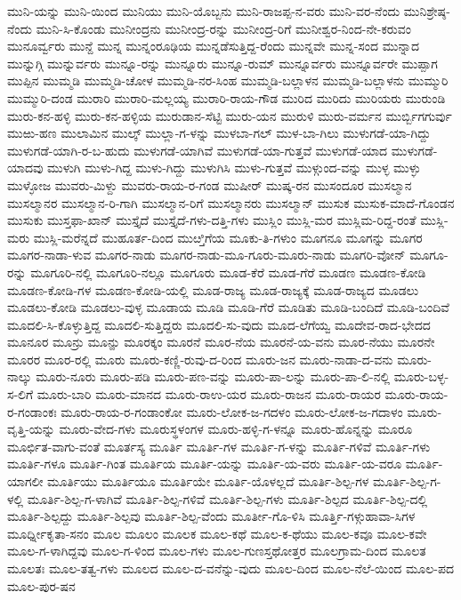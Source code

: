 ಮುನಿ-ಯನ್ನು
ಮುನಿ-ಯಿಂದ
ಮುನಿಯು
ಮುನಿ-ಯೊಬ್ಬನು
ಮುನಿ-ರಾಜಪ್ಪ-ನ-ವರು
ಮುನಿ-ವರ-ನೆಂದು
ಮುನಿಶ್ರೇಷ್ಠ-ನೆಂದು
ಮುನಿ-ಸಿ-ಕೊಂಡು
ಮುನೀಂದ್ರನು
ಮುನೀಂದ್ರ-ರನ್ನು
ಮುನೀಂದ್ರ-ರಿಗೆ
ಮುನೀಶ್ವರ-ನಿಂದ-ನೇ-ಕರುವಂ
ಮುನೂರ್ವ್ವರು
ಮುನ್ದೆ
ಮುನ್ನ
ಮುನ್ನಂರೂಢಿಯ
ಮುನ್ನಡೆಸುತ್ತಿದ್ದ-ರೆಂದು
ಮುನ್ನವೇ
ಮುನ್ನ-ಸಂದ
ಮುನ್ನಾದ
ಮುನ್ನುಗ್ಗಿ
ಮುನ್ನುರ್ವರು
ಮುನ್ನೂ-ರನ್ನು
ಮುನ್ನೂರು
ಮುನ್ನೂ-ರುಮ್
ಮುನ್ನೂರ್ವರು
ಮುನ್ನೂರ್ವರೇ
ಮುಪ್ಪಾಗ
ಮುಪ್ಪಿನ
ಮುಮ್ಮಡಿ
ಮುಮ್ಮಡಿ-ಚೋಳ
ಮುಮ್ಮಡಿ-ನರ-ಸಿಂಹ
ಮುಮ್ಮಡಿ-ಬಲ್ಲಾಳನ
ಮುಮ್ಮಡಿ-ಬಲ್ಲಾಳನು
ಮುಮ್ಮುರಿ
ಮುಮ್ಮುರಿ-ದಂಡ
ಮುರಾರಿ
ಮುರಾರಿ-ಮಲ್ಲಯ್ಯ
ಮುರಾರಿ-ರಾಯ-ಗೌಡ
ಮುರಿದ
ಮುರಿದು
ಮುರಿಯರು
ಮುರುಂಡಿ
ಮುರು-ಕನ-ಹಳ್ಳಿ
ಮುರು-ಕನ-ಹಳ್ಳಿಯ
ಮುರುಡಾನ-ಸೆಟ್ಟಿ
ಮುರು-ಯನ
ಮುರುಳಿ
ಮುರು-ವರ್ಮನ
ಮುರ್ಬ್ಬಿಗಗುರ್ವು
ಮುಱು-ಹಣ
ಮುಲಾಮಿನ
ಮುಲ್ಕ್
ಮುಲ್ಲಾ-ಗ-ಳನ್ನು
ಮುಳಬಾ-ಗಲ್
ಮುಳ-ಬಾ-ಗಿಲು
ಮುಳುಗಡೆ-ಯಾ-ಗಿದ್ದು
ಮುಳುಗಡೆ-ಯಾಗಿ-ರ-ಬ-ಹುದು
ಮುಳುಗಡೆ-ಯಾಗಿವೆ
ಮುಳುಗಡೆ-ಯಾ-ಗುತ್ತವೆ
ಮುಳುಗಡೆ-ಯಾದ
ಮುಳುಗಡೆ-ಯಾದವು
ಮುಳುಗಿ
ಮುಳು-ಗಿದ್ದ
ಮುಳು-ಗಿದ್ದು
ಮುಳುಗಿಸಿ
ಮುಳು-ಗುತ್ತವೆ
ಮುಳ್ಗುಂದ-ವನ್ನು
ಮುಳ್ಳ
ಮುಳ್ಳು
ಮುಳ್ಳೋಜ
ಮುವರು-ಮಿಳ್ದು
ಮುವರು-ರಾಯ-ರ-ಗಂಡ
ಮುಷೀರ್
ಮುಷ್ಕ-ರನ
ಮುಸಂದೂರ
ಮುಸಲ್ಮಾನ
ಮುಸಲ್ಮಾನರ
ಮುಸಲ್ಮಾನ-ರಿ-ಗಾಗಿ
ಮುಸಲ್ಮಾನ-ರಿಗೆ
ಮುಸಲ್ಮಾನರು
ಮುಸಲ್ಮಾನ್
ಮುಸುಕ
ಮುಸುಕ-ಮಾದೆ-ಗೊಂಡನ
ಮುಸುಕು
ಮುಸ್ತಫಾ-ಖಾನ್
ಮುಸ್ತೈದೆ
ಮುಸ್ತೈದೆ-ಗಳು-ದತ್ತಿ-ಗಳು
ಮುಸ್ಲಿಂ
ಮುಸ್ಲಿ-ಮರ
ಮುಸ್ಲಿಮ-ರಿದ್ದ-ರಂತೆ
ಮುಸ್ಲಿ-ಮರು
ಮುಸ್ಲಿ-ಮರೆನ್ನದೆ
ಮುಹೂರ್ತ-ದಿಂದ
ಮುೞ್ತಿಗೆಯ
ಮೂಕು-ತಿ-ಗಳುಂ
ಮೂಗನೂ
ಮೂಗನ್ನು
ಮೂಗರ
ಮೂಗರ-ನಾಡಾ-ಳುವ
ಮೂಗರ-ನಾಡು
ಮೂಗರ-ನಾಡು-ಮೂ-ಗೂರು-ಮೂರು-ನಾಡು
ಮೂಗರಿ-ವೋನ್
ಮೂಗೂ-ರನ್ನು
ಮೂಗೂರಿ-ನಲ್ಲಿ
ಮೂಗೂರಿ-ನಲ್ಲೂ
ಮೂಗೂರು
ಮೂಡ-ಕೆರೆ
ಮೂಡ-ಗೆರೆ
ಮೂಡಣ
ಮೂಡಣ-ಕೋಡಿ
ಮೂಡಣ-ಕೋಡಿ-ಗಳ
ಮೂಡಣ-ಕೋಡಿ-ಯಲ್ಲಿ
ಮೂಡ-ರಾಜ್ಯ
ಮೂಡ-ರಾಜ್ಯಕ್ಕೆ
ಮೂಡ-ರಾಜ್ಯದ
ಮೂಡಲು
ಮೂಡಲು-ಕೋಡಿ
ಮೂಡಲು-ವುಳ್ಳ
ಮೂಡಾಯ
ಮೂಡಿ
ಮೂಡಿ-ಗೆರೆ
ಮೂಡಿತು
ಮೂಡಿ-ಬಂದಿದೆ
ಮೂಡಿ-ಬಂದಿವೆ
ಮೂದಲಿ-ಸಿ-ಕೊಳ್ಳುತ್ತಿದ್ದ
ಮೂದಲಿ-ಸುತ್ತಿದ್ದರು
ಮೂದಲಿ-ಸು-ವುದು
ಮೂದ-ಲೆಗೆಯ್ವ
ಮೂದೇವ-ರಾದ-ಭೇದದ
ಮೂನೂರ
ಮೂನ್ರು
ಮೂನ್ಱು
ಮೂರಕ್ಕಂ
ಮೂರನೆ
ಮೂರ-ನೆಯ
ಮೂರನೆ-ಯ-ವನು
ಮೂರ-ನೆಯು
ಮೂರನೇ
ಮೂರರ
ಮೂರ-ರಲ್ಲಿ
ಮೂರು
ಮೂರು-ಕಣ್ಣಿ-ರುವು-ದ-ರಿಂದ
ಮೂರು-ಜನ
ಮೂರು-ನಾಡಾ-ದ-ವನು
ಮೂರು-ನಾಲ್ಕು
ಮೂರು-ನೂರು
ಮೂರು-ಪಡಿ
ಮೂರು-ಪಣ-ವನ್ನು
ಮೂರು-ಪಾ-ಲನ್ನು
ಮೂರು-ಪಾ-ಲಿ-ನಲ್ಲಿ
ಮೂರು-ಬಳ್ಳ-ಸ-ಲಿಗೆ
ಮೂರು-ಬಾರಿ
ಮೂರು-ಮಾನದ
ಮೂರು-ರಾಉ-ಯರ
ಮೂರು-ರಾಜನ
ಮೂರು-ರಾಯರ
ಮೂರು-ರಾಯ-ರ-ಗಂಡಾಂಕಃ
ಮೂರು-ರಾಯ-ರ-ಗಂಡಾಂಕೋ
ಮೂರು-ಲೋಕ-ಜ-ಗದಳಂ
ಮೂರು-ಲೋಕ-ಜ-ಗದಾಳಂ
ಮೂರು-ವೃತ್ತಿ-ಯನ್ನು
ಮೂರು-ವೇದ-ಗಳು
ಮೂರುಸ್ಥಳಂಗಳ
ಮೂರು-ಹಳ್ಳಿ-ಗ-ಳನ್ನೂ
ಮೂರು-ಹೊನ್ನನ್ನು
ಮೂರೂ
ಮೂರ್ಛಿತ-ವಾಗು-ವಂತೆ
ಮೂರ್ತಸ್ಯ
ಮೂರ್ತಿ
ಮೂರ್ತಿ-ಗಳ
ಮೂರ್ತಿ-ಗ-ಳನ್ನು
ಮೂರ್ತಿ-ಗಳಿವೆ
ಮೂರ್ತಿ-ಗಳು
ಮೂರ್ತಿ-ಗಳೂ
ಮೂರ್ತಿ-ಗಿಂತ
ಮೂರ್ತಿಯ
ಮೂರ್ತಿ-ಯನ್ನು
ಮೂರ್ತಿ-ಯ-ವರು
ಮೂರ್ತಿ-ಯ-ವರೂ
ಮೂರ್ತಿ-ಯಾಗಲೀ
ಮೂರ್ತಿಯು
ಮೂರ್ತಿಯೂ
ಮೂರ್ತಿಯೇ
ಮೂರ್ತಿ-ಯೊಳಲ್ಲದೆ
ಮೂರ್ತಿ-ಶಿಲ್ಪ-ಗಳ
ಮೂರ್ತಿ-ಶಿಲ್ಪ-ಗ-ಳಲ್ಲಿ
ಮೂರ್ತಿ-ಶಿಲ್ಪ-ಗ-ಳಾಗಿವೆ
ಮೂರ್ತಿ-ಶಿಲ್ಪ-ಗಳಿವೆ
ಮೂರ್ತಿ-ಶಿಲ್ಪ-ಗಳು
ಮೂರ್ತಿ-ಶಿಲ್ಪದ
ಮೂರ್ತಿ-ಶಿಲ್ಪ-ದಲ್ಲಿ
ಮೂರ್ತಿ-ಶಿಲ್ಪದ್ದು
ಮೂರ್ತಿ-ಶಿಲ್ಪವು
ಮೂರ್ತಿ-ಶಿಲ್ಪ-ವೆಂದು
ಮೂರ್ತೀ-ಗೊ-ಳಿಸಿ
ಮೂರ್ತ್ತಿ-ಗಳ್ಗುಹಾವಾ-ಸಿಗಳ
ಮೂರ್ಧ್ನೀಕೃತಾ-ಸನಂ
ಮೂಲ
ಮೂಲಂ
ಮೂಲಕ
ಮೂಲ-ಕಥೆ
ಮೂಲ-ಕ-ಥೆಯು
ಮೂಲ-ಕವೂ
ಮೂಲ-ಕವೇ
ಮೂಲ-ಗ-ಳಾಗಿದ್ದವು
ಮೂಲ-ಗ-ಳಿಂದ
ಮೂಲ-ಗಳು
ಮೂಲ-ಗುಣಸ್ತಥೋತ್ತರ
ಮೂಲಗ್ರಾಮ-ದಿಂದ
ಮೂಲತ
ಮೂಲತಃ
ಮೂಲ-ತತ್ವ-ಗಳು
ಮೂಲದ
ಮೂಲ-ದ-ವನೆನ್ನು-ವುದು
ಮೂಲ-ದಿಂದ
ಮೂಲ-ನೆಲೆ-ಯಿಂದ
ಮೂಲ-ಪದ
ಮೂಲ-ಪುರ-ಷನ
